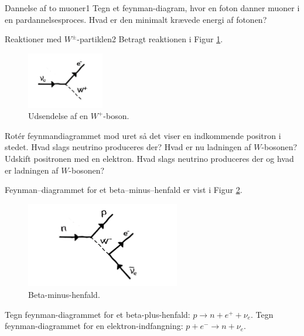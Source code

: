 \begin{opgave}{Dannelse af to muoner}{1}
Tegn et feynman-diagram, hvor en foton danner muoner i en pardannelsesproces. Hvad er den minimalt krævede energi af fotonen? 
\end{opgave}

\begin{opgave}{Reaktioner med $W^\pm$-partiklen}{2}
\label{opg:W}
Betragt reaktionen i Figur \ref{fig:Wvertex}.
\begin{figure}[h]
  \centering
  \includegraphics[width=0.3\textwidth]{KernePartikel/weak_vertex.png}
  \caption{Udsendelse af en $W^+$-boson.}
  \label{fig:Wvertex}
\end{figure}
\opg
Rotér feynmandiagrammet mod uret så det viser en indkommende positron i stedet. Hvad slags neutrino produceres der? Hvad er nu ladningen af $W$-bosonen?
\opg
Udskift positronen med en elektron. Hvad slags neutrino produceres der og hvad er ladningen af $W$-bosonen?

Feynman--diagrammet for et beta--minus--henfald er vist
i Figur \ref{fig:beta_minus}.
\begin{figure}[h]
  \centering
  \includegraphics[width=0.6\textwidth]{KernePartikel/beta_minus.png}
  \caption{Beta-minus-henfald.}
  \label{fig:beta_minus}
\end{figure}
\opg Tegn feynman-diagrammet for et beta-plus-henfald: $p \rightarrow
n + e^+ + \nu_e$.
\opg Tegn feynman-diagrammet for en elektron-indfangning: $p + e^-
\rightarrow n + \nu_e$.


\end{opgave}

